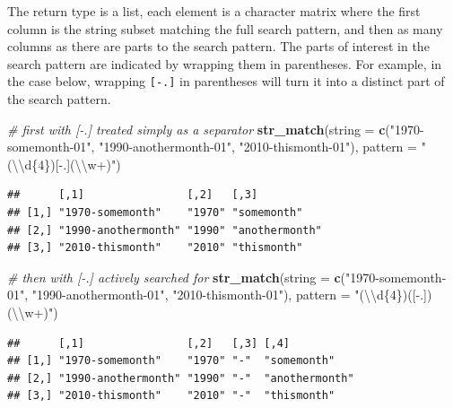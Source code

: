 \documentclass[]{book}
\newenvironment{Shaded}{}{}
\newcommand{\CharTok}[1]{\textcolor[rgb]{0.25,0.44,0.63}{#1}}
\newcommand{\CommentTok}[1]{\textcolor[rgb]{0.38,0.63,0.69}{\textit{#1}}}
\newcommand{\DataTypeTok}[1]{\textcolor[rgb]{0.56,0.13,0.00}{#1}}
\newcommand{\KeywordTok}[1]{\textcolor[rgb]{0.00,0.44,0.13}{\textbf{#1}}}
\newcommand{\NormalTok}[1]{#1}
\newcommand{\StringTok}[1]{\textcolor[rgb]{0.25,0.44,0.63}{#1}}
\begin{document}
The return type is a list, each element is a character matrix where the first column is the string subset matching the full search pattern, and then as many columns as there are parts to the search pattern. The parts of interest in the search pattern are indicated by wrapping them in parentheses. For example, in the case below, wrapping \texttt{{[}-.{]}} in parentheses will turn it into a distinct part of the search pattern.

\begin{Shaded}
\begin{Highlighting}[]
\CommentTok{# first with [-.] treated simply as a separator}
\KeywordTok{str_match}\NormalTok{(}\DataTypeTok{string =} \KeywordTok{c}\NormalTok{(}\StringTok{"1970-somemonth-01"}\NormalTok{,}
                     \StringTok{"1990-anothermonth-01"}\NormalTok{,}
                     \StringTok{"2010-thismonth-01"}\NormalTok{), }
          \DataTypeTok{pattern =} \StringTok{"(}\CharTok{\textbackslash{}\textbackslash{}}\StringTok{d\{4\})[-.](}\CharTok{\textbackslash{}\textbackslash{}}\StringTok{w+)"}\NormalTok{)}
\end{Highlighting}
\end{Shaded}

\begin{verbatim}
##      [,1]                [,2]   [,3]          
## [1,] "1970-somemonth"    "1970" "somemonth"   
## [2,] "1990-anothermonth" "1990" "anothermonth"
## [3,] "2010-thismonth"    "2010" "thismonth"
\end{verbatim}

\begin{Shaded}
\begin{Highlighting}[]
\CommentTok{# then with [-.] actively searched for}
\KeywordTok{str_match}\NormalTok{(}\DataTypeTok{string =} \KeywordTok{c}\NormalTok{(}\StringTok{"1970-somemonth-01"}\NormalTok{,}
                     \StringTok{"1990-anothermonth-01"}\NormalTok{,}
                     \StringTok{"2010-thismonth-01"}\NormalTok{), }
          \DataTypeTok{pattern =} \StringTok{"(}\CharTok{\textbackslash{}\textbackslash{}}\StringTok{d\{4\})([-.])(}\CharTok{\textbackslash{}\textbackslash{}}\StringTok{w+)"}\NormalTok{)}
\end{Highlighting}
\end{Shaded}

\begin{verbatim}
##      [,1]                [,2]   [,3] [,4]          
## [1,] "1970-somemonth"    "1970" "-"  "somemonth"   
## [2,] "1990-anothermonth" "1990" "-"  "anothermonth"
## [3,] "2010-thismonth"    "2010" "-"  "thismonth"
\end{verbatim}
\end{document}
